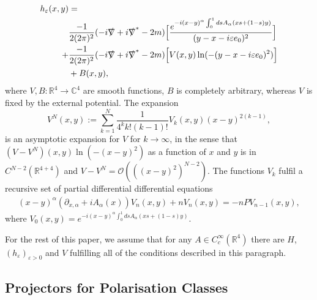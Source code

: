 \documentclass[b5paper,draft,openbib,12pt]{memoir}
\begin{document}
\begin{align}\nonumber
h_\varepsilon (x,y)&=\\\label{eq:hadamardexp1}
&\frac{-1}{2(2\pi)^2}(-i \slashed{\nabla} + i \slashed{\nabla}^\ast -2m)\Big[\frac{e^{-i (x-y)^\alpha\int_0^1 ds A_\alpha (x s + (1-s)y)}}{ (y-x-i \varepsilon e_0)^2}\Big]\\\label{eq:hadamardexp2}
+&\frac{-1}{2(2\pi)^2}(-i \slashed{\nabla} + i \slashed{\nabla}^\ast -2m)\Big[ V(x,y) \ln (-(y-x-i \varepsilon e_0)^2)\Big]\\\label{eq:hadamardexp3}
&+B(x,y),
\end{align}
%
%
where \(V,B:\mathbb{R}^4\rightarrow \mathbb{C}^4\) are smooth functions, \(B\) is completely arbitrary, 
whereas \(V\) is fixed by the external potential. The expansion
\begin{equation}
V^N(x,y):=\sum_{k=1}^N \frac{1}{ 4^{k} k!(k-1)!} V_k(x,y) (x-y)^{2(k-1)},
\end{equation}
is an asymptotic expansion for \(V\) for \(k\rightarrow \infty\), in the sense that
\((V-V^N)(x,y)\ln(-(x-y)^2)\) as a function of \(x\) and \(y\) is in \(C^{N-2}(\mathbb{R}^{4+4})\)
and \(V-V^N=\mathcal{O}\left(\left((x-y)^{2}\right)^{N-2}\right)\).
The functions \(V_k\) fulfil a recursive set of partial differential differential equations
\begin{align}\label{Hadamard recursive equ.}
(x-y)^\alpha (\partial_{x,\alpha}+i A_\alpha(x)) V_{n}(x,y) + n V_{n}(x,y)=-n P V_{n-1}(x,y),
\end{align}
where \(V_{0}(x,y)=e^{-i (x-y)^\alpha\int_0^1 ds A_\alpha (x s + (1-s)y)}\). 

For the rest of this paper, we assume that for any \(A\in C_c^\infty(\mathbb{R}^4)\) there are \(H\), \((h_\varepsilon)_{\varepsilon>0}\) and \(V\)
fulfilling all of the conditions described in this paragraph.








\subsection{Projectors for Polarisation Classes}\label{sec:pol classes}
\end{document}
